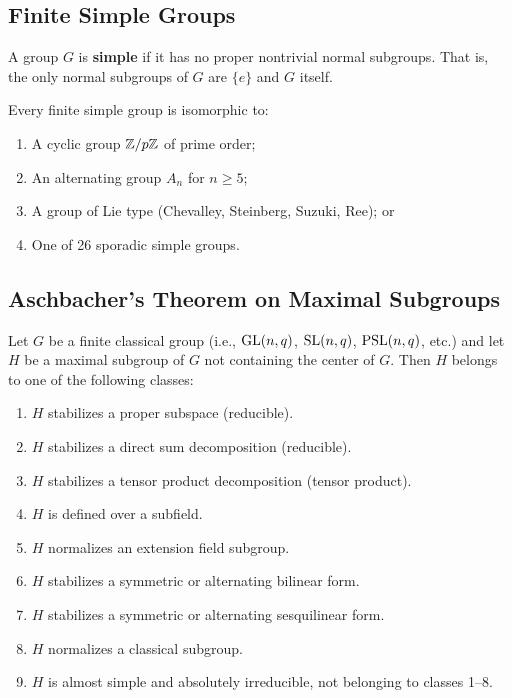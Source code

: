 \subsection{Finite Simple Groups}

\begin{definition}
A group $G$ is \textbf{simple} if it has no proper nontrivial normal subgroups. That is, the only normal subgroups of $G$ are $\{e\}$ and $G$ itself.
\end{definition}

\begin{definition}
Every finite simple group is isomorphic to:
\begin{enumerate}
    \item A cyclic group $\mathbb{Z}/p\mathbb{Z}$ of prime order;
    \item An alternating group $A_n$ for $n \geq 5$;
    \item A group of Lie type (Chevalley, Steinberg, Suzuki, Ree); or
    \item One of 26 sporadic simple groups.
\end{enumerate}
\end{definition}

\subsection{Aschbacher's Theorem on Maximal Subgroups}

\begin{theorem}[Aschbacher, 1984]
Let $G$ be a finite classical group (i.e., $\operatorname{GL}(n,q)$, $\operatorname{SL}(n,q)$, $\operatorname{PSL}(n,q)$, etc.) and let $H$ be a maximal subgroup of $G$ not containing the center of $G$. Then $H$ belongs to one of the following classes:
\begin{enumerate}
    \item $H$ stabilizes a proper subspace (reducible).
    \item $H$ stabilizes a direct sum decomposition (reducible).
    \item $H$ stabilizes a tensor product decomposition (tensor product).
    \item $H$ is defined over a subfield.
    \item $H$ normalizes an extension field subgroup.
    \item $H$ stabilizes a symmetric or alternating bilinear form.
    \item $H$ stabilizes a symmetric or alternating sesquilinear form.
    \item $H$ normalizes a classical subgroup.
    \item $H$ is almost simple and absolutely irreducible, not belonging to classes 1--8.
\end{enumerate}
\end{theorem}


